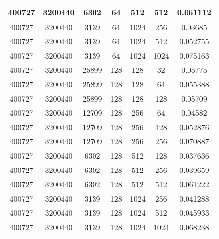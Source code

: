\documentclass[9pt]{article}
\begin{document}
\begin{tabular}{|c|c|c|c|c|c|c| }
\hline
400727  & 3200440  & 6302  & 64  & 512  & 512  & 0.061112 \\
\hline
400727  & 3200440  & 3139  & 64  & 1024  & 256  & 0.03685 \\
\hline
400727  & 3200440  & 3139  & 64  & 1024  & 512  & 0.052755 \\
\hline
400727  & 3200440  & 3139  & 64  & 1024  & 1024  & 0.075163 \\
\hline
400727  & 3200440  & 25899  & 128  & 128  & 32  & 0.05775 \\
\hline
400727  & 3200440  & 25899  & 128  & 128  & 64  & 0.055388 \\
\hline
400727  & 3200440  & 25899  & 128  & 128  & 128  & 0.05709 \\
\hline
400727  & 3200440  & 12709  & 128  & 256  & 64  & 0.04582 \\
\hline
400727  & 3200440  & 12709  & 128  & 256  & 128  & 0.052876 \\
\hline
400727  & 3200440  & 12709  & 128  & 256  & 256  & 0.070887 \\
\hline
400727  & 3200440  & 6302  & 128  & 512  & 128  & 0.037636 \\
\hline
400727  & 3200440  & 6302  & 128  & 512  & 256  & 0.039659 \\
\hline
400727  & 3200440  & 6302  & 128  & 512  & 512  & 0.061222 \\
\hline
400727  & 3200440  & 3139  & 128  & 1024  & 256  & 0.041288 \\
\hline
400727  & 3200440  & 3139  & 128  & 1024  & 512  & 0.045933 \\
\hline
400727  & 3200440  & 3139  & 128  & 1024  & 1024  & 0.068238 \\
\hline
\end{tabular}
 
\end{document}

